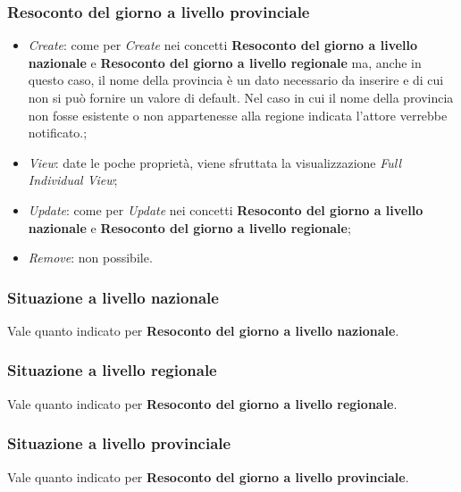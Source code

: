 \subsubsection{Resoconto del giorno a livello provinciale}
\label{sss:operazioni-resoconto-del-giorno-livello-provinciale}
\begin{itemize}
    \item \textit{Create}: come per \textit{Create} nei concetti \textbf{Resoconto del giorno a livello nazionale} e \textbf{Resoconto del giorno a livello regionale} ma, anche in questo caso, il nome della provincia è un dato necessario da inserire e di cui non si può fornire un valore di default.
    Nel caso in cui il nome della provincia non fosse esistente o non appartenesse alla regione indicata l'attore verrebbe notificato.;
    \item \textit{View}: date le poche proprietà, viene sfruttata la visualizzazione \textit{Full Individual View};
    \item \textit{Update}: come per \textit{Update} nei concetti \textbf{Resoconto del giorno a livello nazionale} e \textbf{Resoconto del giorno a livello regionale};
    \item \textit{Remove}: non possibile.
\end{itemize}

\subsubsection{Situazione a livello nazionale}
\label{sss:operazioni-situazione-livello-nazionale}
Vale quanto indicato per \textbf{Resoconto del giorno a livello nazionale}.

\subsubsection{Situazione a livello regionale}
\label{sss:operazioni-situazione-livello-regionale}
Vale quanto indicato per \textbf{Resoconto del giorno a livello regionale}.

\subsubsection{Situazione a livello provinciale}
\label{sss:operazioni-situazione-livello-provinciale}
Vale quanto indicato per \textbf{Resoconto del giorno a livello provinciale}.

